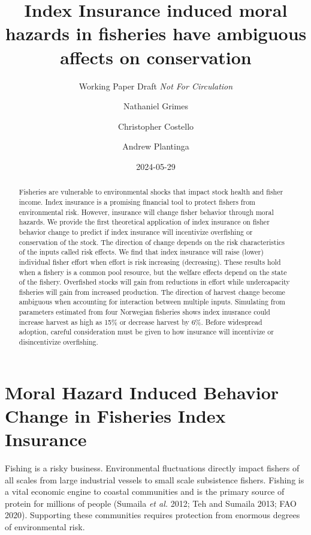 \documentclass[
  letterpaper,
  DIV=11,
  numbers=noendperiod]{scrartcl}
\title{Index Insurance induced moral hazards in fisheries have ambiguous
affects on conservation}
\subtitle{Working Paper Draft \emph{Not For Circulation}}
\author{Nathaniel Grimes \and Christopher Costello \and Andrew
Plantinga}
\date{2024-05-29}
\renewcommand*\contentsname{Table of contents}
\newcommand\contentsname{Table of contents}
\theoremstyle{plain}
\theoremstyle{plain}
\theoremstyle{remark}
\begin{document}
\maketitle
\begin{abstract}
Fisheries are vulnerable to environmental shocks that impact stock
health and fisher income. Index insurance is a promising financial tool
to protect fishers from environmental risk. However, insurance will
change fisher behavior through moral hazards. We provide the first
theoretical application of index insurance on fisher behavior change to
predict if index insurance will incentivize overfishing or conservation
of the stock. The direction of change depends on the risk
characteristics of the inputs called risk effects. We find that index
insurance will raise (lower) individual fisher effort when effort is
risk increasing (decreasing). These results hold when a fishery is a
common pool resource, but the welfare effects depend on the state of the
fishery. Overfished stocks will gain from reductions in effort while
undercapacity fisheries will gain from increased production. The
direction of harvest change become ambiguous when accounting for
interaction between multiple inputs. Simulating from parameters
estimated from four Norwegian fisheries shows index inusrance could
increase harvest as high as 15\% or decrease harvest by 6\%. Before
widespread adoption, careful consideration must be given to how
insurance will incentivize or disincentivize overfishing.
\end{abstract}
\ifdefined\Shaded\renewenvironment{Shaded}{\begin{tcolorbox}[frame hidden, enhanced, sharp corners, breakable, interior hidden, borderline west={3pt}{0pt}{shadecolor}, boxrule=0pt]}{\end{tcolorbox}}\fi

\renewcommand*\contentsname{Table of contents}
{
\hypersetup{linkcolor=}
\setcounter{tocdepth}{3}
\tableofcontents
}
\hypertarget{moral-hazard-induced-behavior-change-in-fisheries-index-insurance}{%
\section{Moral Hazard Induced Behavior Change in Fisheries Index
Insurance}\label{moral-hazard-induced-behavior-change-in-fisheries-index-insurance}}

Fishing is a risky business. Environmental fluctuations directly impact
fishers of all scales from large industrial vessels to small scale
subsistence fishers. Fishing is a vital economic engine to coastal
communities and is the primary source of protein for millions of people
(Sumaila \emph{et al.} 2012; Teh and Sumaila 2013; FAO 2020). Supporting
these communities requires protection from enormous degrees of
environmental risk.
\end{document}
